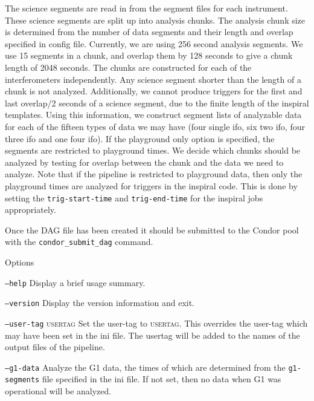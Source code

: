 \begin{entry}
The science segments are read in from the segment files for each instrument.
These science segments are split up into analysis chunks.  The analysis chunk
size is determined from the number of data segments and their length and
overlap specified in config file. Currently, we are using 256 second analysis
segments.  We use 15 segments in a chunk, and overlap them by 128 seconds to
give a chunk length of 2048 seconds.  The chunks are constructed for each of
the interferometers independently.  Any science segment shorter than the
length of a chunk is not analyzed.  Additionally, we cannot produce triggers
for the first and last overlap/2 seconds of a science segment, due to the
finite length of the inspiral templates.  Using this information, we construct
segment lists of analyzable data for each of the fifteen types of data we may
have (four single ifo, six two ifo, four three ifo and one four ifo).  If the
playground only option is specified, the segments are restricted to playground
times.  We decide which chunks should be analyzed by testing for overlap
between the chunk and the data we need to analyze.  Note that if the pipeline
is restricted to playground data, then only the playground times are analyzed
for triggers in the inspiral code.  This is done by setting the
\verb$trig-start-time$ and \verb$trig-end-time$ for the inspiral jobs
appropriately.

Once the DAG file has been created it should be submitted to the Condor pool
with the \verb$condor_submit_dag$ command.

\item[Options]\leavevmode
\begin{entry}
\item[\texttt{--help}] Display a brief usage summary.
\end{entry}
  
\begin{entry}
\item[\texttt{--version}] Display the version information and exit.
\end{entry}
  
\begin{entry}
\item[\texttt{--user-tag} \textsc{usertag}] Set the user-tag to \textsc{usertag}.  This overrides the user-tag which may have been set in the ini file.  The usertag will be added to the names of the output files of the pipeline.
\end{entry}
 
\begin{entry}
\item[\texttt{--g1-data}] Analyze the G1 data, the times of which are
determined from the \verb$g1-segments$ file specified in the ini file.  If not
set, then no data when G1 was operational will be analyzed.
\end{entry}


\end{entry}
